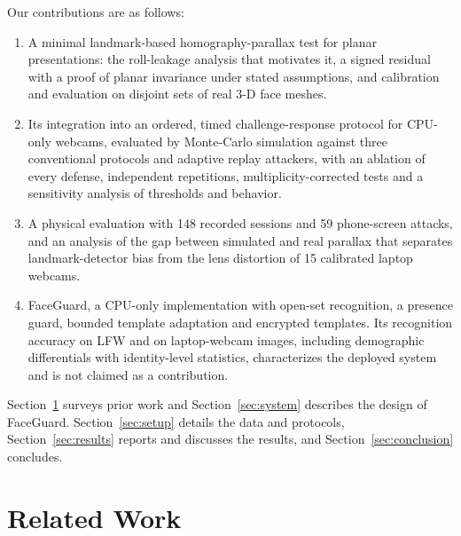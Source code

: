 \documentclass{ieeeaccess}
\begin{document}
Our contributions are as follows:
\begin{enumerate}
\item A minimal landmark-based homography-parallax test for planar presentations: the roll-leakage analysis that motivates it, a signed residual with a proof of planar invariance under stated assumptions, and calibration and evaluation on disjoint sets of real 3-D face meshes.
\item Its integration into an ordered, timed challenge-response protocol for CPU-only webcams, evaluated by Monte-Carlo simulation against three conventional protocols and adaptive replay attackers, with an ablation of every defense, independent repetitions, multiplicity-corrected tests and a sensitivity analysis of thresholds and behavior.
\item A physical evaluation with 148 recorded sessions and 59 phone-screen attacks, and an analysis of the gap between simulated and real parallax that separates landmark-detector bias from the lens distortion of 15 calibrated laptop webcams.
\item FaceGuard, a CPU-only implementation with open-set recognition, a presence guard, bounded template adaptation and encrypted templates. Its recognition accuracy on LFW and on laptop-webcam images, including demographic differentials with identity-level statistics, characterizes the deployed system and is not claimed as a contribution.
\end{enumerate}
Section~\ref{sec:related} surveys prior work and Section~\ref{sec:system} describes the design of FaceGuard. Section~\ref{sec:setup} details the data and protocols, Section~\ref{sec:results} reports and discusses the results, and Section~\ref{sec:conclusion} concludes.

\section{Related Work}\label{sec:related}
\end{document}
